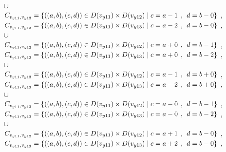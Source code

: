 \\$\cup$
\\$C_{v_{y11},v_{y12}}=\{((a,b),(c,d))\in D(v_{y11})\times D(v_{y12})\mid c = a - 1\hspace{1ex} , \hspace{1ex}  d = b - 0 \}$ , 
\\$C_{v_{y11},v_{y13}}=\{((a,b),(c,d))\in D(v_{y11})\times D(v_{y13})\mid c = a - 2\hspace{1ex} , \hspace{1ex}  d = b - 0 \}$ , 
\\$\cup$
\\$C_{v_{y11},v_{y12}}=\{((a,b),(c,d))\in D(v_{y11})\times D(v_{y12})\mid c = a + 0\hspace{1ex} , \hspace{1ex}  d = b - 1 \}$ , 
\\$C_{v_{y11},v_{y13}}=\{((a,b),(c,d))\in D(v_{y11})\times D(v_{y13})\mid c = a + 0\hspace{1ex} , \hspace{1ex}  d = b - 2 \}$ , 
\\$\cup$
\\$C_{v_{y11},v_{y12}}=\{((a,b),(c,d))\in D(v_{y11})\times D(v_{y12})\mid c = a - 1\hspace{1ex} , \hspace{1ex}  d = b + 0 \}$ , 
\\$C_{v_{y11},v_{y13}}=\{((a,b),(c,d))\in D(v_{y11})\times D(v_{y13})\mid c = a - 2\hspace{1ex} , \hspace{1ex}  d = b + 0 \}$ , 
\\$\cup$
\\$C_{v_{y11},v_{y12}}=\{((a,b),(c,d))\in D(v_{y11})\times D(v_{y12})\mid c = a - 0\hspace{1ex} , \hspace{1ex}  d = b - 1 \}$ , 
\\$C_{v_{y11},v_{y13}}=\{((a,b),(c,d))\in D(v_{y11})\times D(v_{y13})\mid c = a - 0\hspace{1ex} , \hspace{1ex}  d = b - 2 \}$ , 
\\$\cup$
\\$C_{v_{y11},v_{y12}}=\{((a,b),(c,d))\in D(v_{y11})\times D(v_{y12})\mid c = a + 1\hspace{1ex} , \hspace{1ex}  d = b - 0 \}$ , 
\\$C_{v_{y11},v_{y13}}=\{((a,b),(c,d))\in D(v_{y11})\times D(v_{y13})\mid c = a + 2\hspace{1ex} , \hspace{1ex}  d = b - 0 \}$ , 
